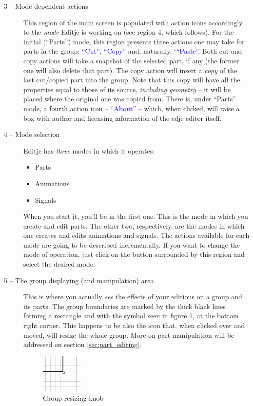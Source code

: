 \documentclass[a4paper]{profusion}
\newcommand{\GUIIcon}[1]{\textcolor{blue}{#1}}    %
\begin{document}
\begin{description}
\item[3 -- Mode dependent actions] This region of the main screen is
  populated with action icons accordingly to the \emph{mode} Editje is
  working on (see region 4, which follows). For the initial
  (``Parts'') mode, this region presents three actions one may take
  for parts in the group: \GUIIcon{``Cut''}, \GUIIcon{``Copy''} and,
  naturally, `\GUIIcon{``Paste''}. Both cut and copy actions will take
  a snapshot of the selected part, if any (the former one will also
  delete that part). The copy action will insert a \emph{copy} of the
  last cut/copied part into the group. Note that this copy will have
  all the properties equal to those of its source, \emph{including
    geometry} -- it will be placed where the original one was copied
  from. There is, under ``Parts'' mode, a fourth action icon --
  \GUIIcon{``About''} -- which, when clicked, will raise a box with
  author and licensing information of the edje editor itself.

\item[4 -- Mode selection] Editje has \emph{three} modes in which it
  operates:
  \begin{itemize}
  \item Parts
  \item Animations
  \item Signals
  \end{itemize}
  When you start it, you'll be in the first one. This is the mode in
  which you create and edit parts. The other two, respectively, are
  the modes in which one creates and edits animations and signals. The
  actions available for each mode are going to be described
  incrementally. If you want to change the mode of operation, just
  click on the button surrounded by this region and select the desired
  mode.

\item[5 -- The group displaying (and manipulation) area] This is where
  you actually \emph{see} the effects of your editions on a group and
  its parts. The group boundaries are marked by the thick black lines
  forming a rectangle and with the symbol seen in figure
  \ref{fig:group_edje}, at the bottom right corner. This happens to be
  also the icon that, when clicked over and moved, will resize the
  whole group. More on part manipulation will be addressed on section
  \ref{sec:part_editing}.

\begin{figure}[h!]
  \centering
  \includegraphics[width=0.2\textwidth]{images/group_edje.png}
  \caption{Group resizing knob}
  \label{fig:group_edje}
\end{figure}


\end{description}
\end{document}
